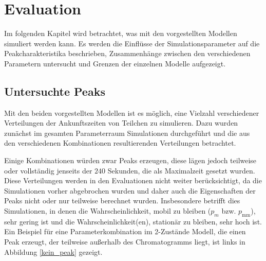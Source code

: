 
\chapter{Evaluation}
\label{chapter:eva}
Im folgenden Kapitel wird betrachtet, was mit den vorgestellten Modellen simuliert werden kann. Es werden die Einflüsse der Simulationsparameter auf die Peakcharakteristika beschrieben, Zusammenhänge zwischen den verschiedenen Parametern untersucht und Grenzen der einzelnen Modelle aufgezeigt.


\section{Untersuchte Peaks}
Mit den beiden vorgestellten Modellen ist es möglich, eine Vielzahl verschiedener Verteilungen der Ankunftszeiten von Teilchen zu simulieren. 
Dazu wurden zunächst im gesamten Parameterraum Simulationen durchgeführt und die aus den verschiedenen Kombinationen resultierenden Verteilungen betrachtet.

Einige Kombinationen würden zwar Peaks erzeugen, diese lägen jedoch teilweise oder vollständig jenseits der $240$ Sekunden, die als Maximalzeit gesetzt wurden. Diese Verteilungen werden in den Evaluationen nicht weiter berücksichtigt, da die Simulationen vorher abgebrochen wurden und daher auch die Eigenschaften der Peaks nicht oder nur teilweise berechnet wurden. Insbesondere betrifft dies Simulationen, in denen die Wahrscheinlichkeit, mobil zu bleiben ($p_m$ bzw. $p_{\text{mm}}$), sehr gering ist und die Wahrscheinlichkeit(en), stationär zu bleiben, sehr hoch ist. Ein Beispiel für eine Parameterkombination im 2-Zustände Modell, die einen Peak erzeugt, der teilweise außerhalb des Chromatogramms liegt, ist links in Abbildung \ref{kein_peak} gezeigt.

